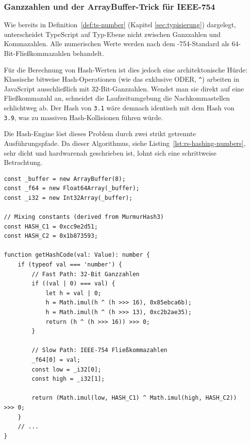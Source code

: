 \subsubsection{Ganzzahlen und der ArrayBuffer-Trick für IEEE-754}
\label{subsubsec:rs-intern-hash-numbers}

Wie bereits in Definition~\ref{def:ts-number} (Kapitel \ref{sec:typisierung}) dargelegt, unterscheidet TypeScript auf Typ-Ebene nicht zwischen Ganzzahlen und Kommazahlen. Alle numerischen Werte werden nach dem -754-Standard als 64-Bit-Fließkommazahlen behandelt. 

Für die Berechnung von Hash-Werten ist dies jedoch eine architektonische Hürde: Klassische bitweise Hash-Operationen (wie das exklusive ODER, \texttt{^}) arbeiten in JavaScript ausschließlich mit 32-Bit-Ganzzahlen. Wendet man sie direkt auf eine Fließkommazahl an, schneidet die Laufzeitumgebung die Nachkommastellen schlichtweg ab. Der Hash von \texttt{3.1} wäre demnach identisch mit dem Hash von \texttt{3.9}, was zu massiven Hash-Kollisionen führen würde.

Die Hash-Engine löst dieses Problem durch zwei strikt getrennte Ausführungspfade. Da dieser Algorithmus, siehe Listing~\ref{lst:rs-hashing-numbers}, sehr dicht und hardwarenah geschrieben ist, lohnt sich eine schrittweise Betrachtung.

\begin{listing}[ht]
    \caption{Hashing von numerischen Werten}
    \label{lst:rs-hashing-numbers}
    \begin{verbatim}
const _buffer = new ArrayBuffer(8);
const _f64 = new Float64Array(_buffer);
const _i32 = new Int32Array(_buffer);

// Mixing constants (derived from MurmurHash3)
const HASH_C1 = 0xcc9e2d51;
const HASH_C2 = 0x1b873593;

function getHashCode(val: Value): number {
    if (typeof val === 'number') {
        // Fast Path: 32-Bit Ganzzahlen
        if ((val | 0) === val) {
            let h = val | 0;
            h = Math.imul(h ^ (h >>> 16), 0x85ebca6b);
            h = Math.imul(h ^ (h >>> 13), 0xc2b2ae35);
            return (h ^ (h >>> 16)) >>> 0;
        }

        // Slow Path: IEEE-754 Fließkommazahlen
        _f64[0] = val;
        const low = _i32[0];
        const high = _i32[1];

        return (Math.imul(low, HASH_C1) ^ Math.imul(high, HASH_C2)) >>> 0;
    }
    // ...
}
    \end{verbatim}
\end{listing}

